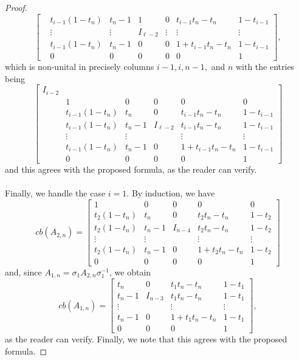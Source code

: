 \documentclass[10pt,a4paper]{amsart}
\begin{document}
\begin{proof}
$$\begin{bmatrix}
		&t_{i-1}(1-t_n)&t_n-1 & 1 & 0 &t_{i-1}t_n-t_n&1-t_{i-1}\\
		&\vdots & \vdots & I_{\ell-2}& \vdots & \vdots &\vdots \\
		&t_{i-1}(1-t_n)&t_n-1 & 0 & 0 & 1+t_{i-1}t_n-t_n &1-t_{i-1}\\
		&0& 0& 0& 0& 0& 1
	\end{bmatrix},$$
	which is non-unital in precisely columns $i-1,i,n-1,$ and $n$ with the entries being
	$$\begin{bmatrix}
		I_{i-2}&\\
		&1 & 0 & 0 & 0&0\\
		&t_{i-1}(1-t_n)&t_n & 0 &t_{i-1}t_n-t_n&1-t_{i-1}\\
		&t_{i-1}(1-t_n)&t_n-1 & I_{\ell-2} & t_{i-1}t_n-t_n&1-t_{i-1}\\
		&\vdots &\vdots & & \vdots &\vdots \\
		&t_{i-1}(1-t_n)&t_n-1 & 0 & 1+t_{i-1}t_n-t_n & 1-t_{i-1}\\
		&0 & 0 & 0 & 0 & 1
	\end{bmatrix}$$
	and this agrees with the proposed formula, as the reader can verify.
	\\
	\\
	Finally, we handle the case $i=1$. By induction, we have 
	$$cb(A_{2,n})=
	\begin{bmatrix}
		1 & 0 & 0 & 0&0\\
		t_2(1-t_n)&t_n & 0 &t_2t_n-t_n&1-t_2\\
		t_2(1-t_n)&t_n-1 & I_{n-4} & t_2t_n-t_n&1-t_2\\
		\vdots &\vdots & & \vdots&\vdots \\
		t_2(1-t_n)&t_n-1 & 0 & 1+t_2t_n-t_n&1-t_2\\
		0 & 0 & 0 & 0& 1
	\end{bmatrix}
	$$
	and, since $A_{1,n}=\sigma_1A_{2,n}\sigma_1^{-1}$, we obtain 
	$$cb(A_{1,n})=
	\begin{bmatrix}
		t_n & 0 &t_1t_n-t_n&1-t_1\\
		t_n-1 & I_{n-3} & t_1t_n-t_n&1-t_1\\
		\vdots & & \vdots & \vdots\\
		t_n-1 & 0 & 1+t_1t_n-t_n&1-t_1\\
		0 & 0 & 0 & 1
	\end{bmatrix},
	$$
	as the reader can verify. Finally, we note that this agrees
	with the proposed formula.
\end{proof}
\end{document}
